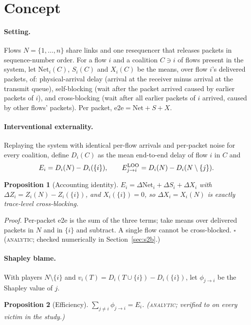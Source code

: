 \documentclass[11pt]{article}
\newcommand{\tagA}{\textsc{analytic}}
\newtheorem{proposition}{Proposition}
\begin{document}
\section{Concept}
\paragraph{Setting.} Flows $N=\{1,\dots,n\}$ share links and one resequencer that releases packets in sequence-number order. For a flow $i$ and a coalition $C\ni i$ of flows present in the system, let $\mathrm{Net}_i(C)$, $S_i(C)$ and $X_i(C)$ be the means, over flow $i$'s delivered packets, of: physical-arrival delay (arrival at the receiver minus arrival at the transmit queue), self-blocking (wait after the packet arrived caused by earlier packets of $i$), and cross-blocking (wait after all earlier packets of $i$ arrived, caused by other flows' packets). Per packet, $\mathrm{e2e}=\mathrm{Net}+S+X$.

\paragraph{Interventional externality.} Replaying the system with identical per-flow arrivals and per-packet noise for every coalition, define $D_i(C)$ as the mean end-to-end delay of flow $i$ in $C$ and
\[
E_i = D_i(N)-D_i(\{i\}),\qquad E_{j\to i}^{\rm LOO}=D_i(N)-D_i(N\setminus\{j\}).
\]
\begin{proposition}[Accounting identity]\label{prop:id}
$E_i=\Delta\mathrm{Net}_i+\Delta S_i+\Delta X_i$ with $\Delta Z_i=Z_i(N)-Z_i(\{i\})$, and $X_i(\{i\})=0$, so $\Delta X_i=X_i(N)$ is exactly trace-level cross-blocking.
\end{proposition}
\emph{Proof.} Per-packet e2e is the sum of the three terms; take means over delivered packets in $N$ and in $\{i\}$ and subtract. A single flow cannot be cross-blocked. \hfill$\square$ (\tagA{}; checked numerically in Section~\ref{sec:s2b}.)

\paragraph{Shapley blame.} With players $N\setminus\{i\}$ and $v_i(T)=D_i(T\cup\{i\})-D_i(\{i\})$, let $\phi_{j\to i}$ be the Shapley value of $j$.
\begin{proposition}[Efficiency]\label{prop:eff}
$\sum_{j\ne i}\phi_{j\to i}=E_i$. \hfill (\tagA{}; verified to \SBVone{} on every victim in the study.)
\end{proposition}
\end{document}
